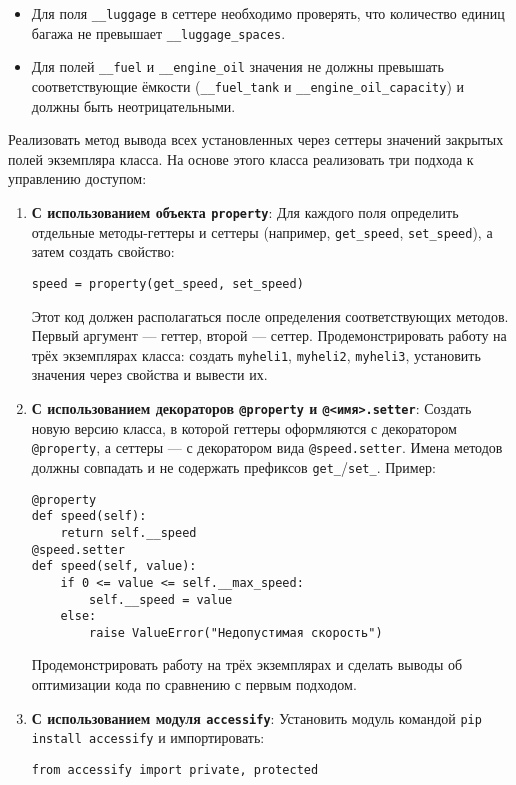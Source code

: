 \begin{enumerate}
\begin{itemize}
    \item Для поля \texttt{\_\_luggage} в сеттере необходимо проверять, что количество единиц багажа не превышает \texttt{\_\_luggage\_spaces}.
    \item Для полей \texttt{\_\_fuel} и \texttt{\_\_engine\_oil} значения не должны превышать соответствующие ёмкости (\texttt{\_\_fuel\_tank} и \texttt{\_\_engine\_oil\_capacity}) и должны быть неотрицательными.
\end{itemize}
Реализовать метод вывода всех установленных через сеттеры значений закрытых полей экземпляра класса.
На основе этого класса реализовать три подхода к управлению доступом:
\begin{enumerate}
    \item \textbf{С использованием объекта \texttt{property}}:  
    Для каждого поля определить отдельные методы-геттеры и сеттеры (например, \texttt{get\_speed}, \texttt{set\_speed}), а затем создать свойство:  
    \begin{verbatim}
speed = property(get_speed, set_speed)
    \end{verbatim}  
    Этот код должен располагаться после определения соответствующих методов. Первый аргумент — геттер, второй — сеттер.  
    Продемонстрировать работу на трёх экземплярах класса: создать \texttt{myheli1}, \texttt{myheli2}, \texttt{myheli3}, установить значения через свойства и вывести их.
    \item \textbf{С использованием декораторов \texttt{@property} и \texttt{@<имя>.setter}}:  
    Создать новую версию класса, в которой геттеры оформляются с декоратором \texttt{@property}, а сеттеры — с декоратором вида \texttt{@speed.setter}. Имена методов должны совпадать и не содержать префиксов \texttt{get\_}/\texttt{set\_}.  
    Пример:  
    \begin{verbatim}
@property
def speed(self):
    return self.__speed
@speed.setter
def speed(self, value):
    if 0 <= value <= self.__max_speed:
        self.__speed = value
    else:
        raise ValueError("Недопустимая скорость")
    \end{verbatim}  
    Продемонстрировать работу на трёх экземплярах и сделать выводы об оптимизации кода по сравнению с первым подходом.
    \item \textbf{С использованием модуля \texttt{accessify}}:  
    Установить модуль командой \texttt{pip install accessify} и импортировать:  
    \begin{verbatim}
from accessify import private, protected
    \end{verbatim}  

\end{enumerate}
\end{enumerate}

